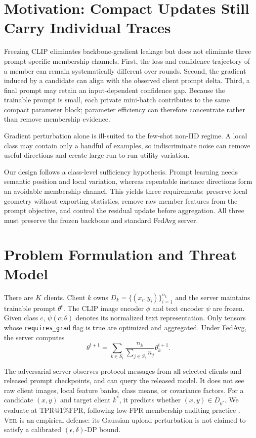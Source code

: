\documentclass[letterpaper]{article}
\makeatletter
\newcommand{\method}{\textsc{Veil}}
\newcommand{\tpr}{\ensuremath{\mathrm{TPR}@1\%\mathrm{FPR}}}
\makeatother
\begin{document}
\section{Motivation: Compact Updates Still Carry Individual Traces}

Freezing CLIP eliminates backbone-gradient leakage but does not eliminate three
prompt-specific membership channels.  First, the loss and confidence trajectory
of a member can remain systematically different over rounds.  Second, the
gradient induced by a candidate can align with the observed client prompt delta.
Third, a final prompt may retain an input-dependent confidence gap.  Because the
trainable prompt is small, each private mini-batch contributes to the same compact
parameter block; parameter efficiency can therefore concentrate rather than
remove membership evidence.

Gradient perturbation alone is ill-suited to the few-shot non-IID regime.  A
local class may contain only a handful of examples, so indiscriminate noise can
remove useful directions and create large run-to-run utility variation.

Our design follows a class-level sufficiency hypothesis.  Prompt learning needs
semantic position and local variation, whereas repeatable instance directions
form an avoidable membership channel.  This yields three requirements: preserve
local geometry without exporting statistics, remove raw member features from
the prompt objective, and control the residual update before aggregation.  All
three must preserve the frozen backbone and standard FedAvg server.

\section{Problem Formulation and Threat Model}

There are $K$ clients.  Client $k$ owns
$D_k=\{(x_i,y_i)\}_{i=1}^{n_k}$ and the server maintains trainable prompt
$\theta^t$.  The CLIP image encoder $\phi$ and text encoder $\psi$ are frozen.
Given class $c$, $\psi(c;\theta)$ denotes its normalized text representation.
Only tensors whose \texttt{requires\_grad} flag is true are optimized and
aggregated.  Under FedAvg, the server computes
\begin{equation}
\theta^{t+1}=\sum_{k\in S_t}\frac{n_k}{\sum_{j\in S_t}n_j}\theta_k^{t+1}.
\end{equation}

The adversarial server observes protocol messages from all selected clients and
released prompt checkpoints, and can query the released model.  It does not see
raw client images, local feature banks, class means, or covariance factors.  For
a candidate $(x,y)$ and target client $k^*$, it predicts whether
$(x,y)\in D_{k^*}$.  We evaluate at \tpr{}, following low-FPR membership
auditing practice \citep{carlini2022membership}.  \method{} is an empirical
defense: its Gaussian upload perturbation is not claimed to satisfy a calibrated
$(\epsilon,\delta)$-DP bound.
\end{document}
